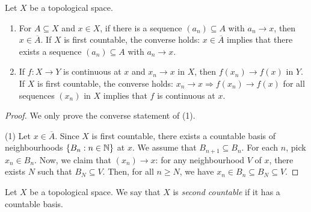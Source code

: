 \begin{theorem}
    Let $X$ be a topological space.

    \begin{enumerate}
        \item For $A\subseteq X$ and $x\in X$, if there is a sequence $(a_n)\subseteq A$ with $a_n\to x$, then $x\in\overline{A}$. If $X$ is first countable, the converse holds: $x\in\overline{A}$ implies that there exists a sequence $(a_n)\subseteq A$ with $a_n\to x$.
        \item If $f:X\to Y$ is continuous at $x$ and $x_n\to x$ in $X$, then $f(x_n)\to f(x)$ in $Y$. If $X$ is first countable, the converse holds: $x_n\to x\Rightarrow f(x_n)\to f(x)$ for all sequences $(x_n)$ in $X$ implies that $f$ is continuous at $x$.
    \end{enumerate}
\end{theorem}
\begin{proof}
    We only prove the converse statement of (1).

    (1) Let $x\in\overline{A}$. Since $X$ is first countable, there exists a countable basis of neighbourhoods $\{B_n:n\in\mathbb{N}\}$ at $x$. We assume that $B_{n+1}\subseteq B_n$. For each $n$, pick $x_n\in B_n$. Now, we claim that $(x_n)\to x$: for any neighbourhood $V$ of $x$, there exists $N$ such that $B_N\subseteq V$. Then, for all $n\ge N$, we have $x_n\in B_n \subseteq B_N \subseteq V$.

\end{proof}

\begin{definition}
    Let $X$ be a topological space. We say that $X$ is \emph{second countable} if it has a countable basis.
\end{definition}

